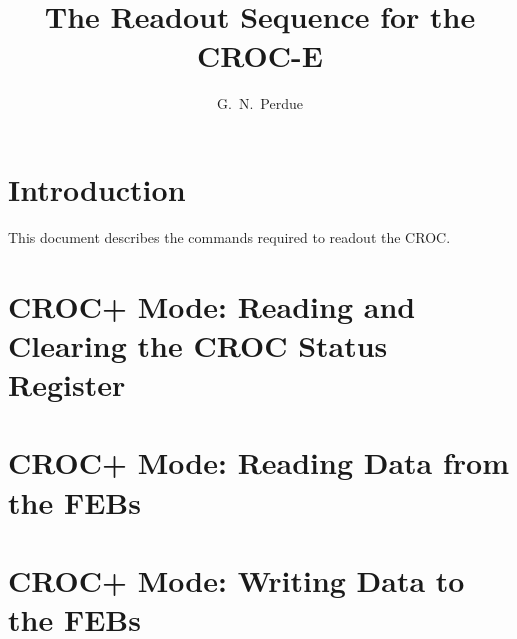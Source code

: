 




\linenumbers

\title{The Readout Sequence for the \minerva CROC-E}

\author[1]{G.~N.~Perdue}
\affil[1]{\Rochester}

\maketitle


\section{Introduction}
\label{sec:introduction}

This document describes the commands required to readout the \minerva CROC.

\section{CROC+ Mode: Reading and Clearing the CROC Status Register}
\label{sec:readandclearcrocstatus}


\section{CROC+ Mode: Reading Data from the FEBs}
\label{sec:readfromfebs}


\section{CROC+ Mode: Writing Data to the FEBs}
\label{sec:writetofebs}






